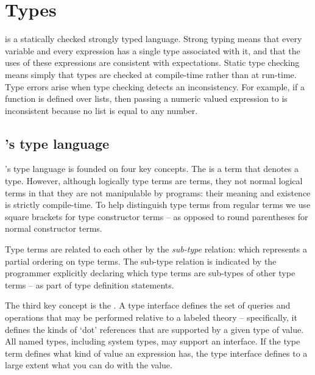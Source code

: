 \chapter{Types}
\label{types}

\go is a statically checked strongly typed language. 
Strong typing means that every variable and every expression has a single type associated with it, and that the uses of these expressions are consistent with expectations. Static type checking means simply that types are checked at compile-time rather than at run-time.  Type errors arise when type checking detects an inconsistency. For example, if a function  is defined over lists, then passing a numeric valued expression to  is inconsistent because no list is equal to any number. 

\section{\go's type language}
\go's type language is founded on four key concepts. The  is a term that denotes a type. However, although logically type terms are terms, they not normal logical terms in that they are not manipulable by \go programs: their meaning and existence is strictly compile-time. To help distinguish type terms from regular terms we use square brackets for type constructor terms -- as opposed to round parentheses for normal constructor terms.

Type terms are related to each other by the \emph{sub-type} relation: which represents a partial ordering on type terms. The sub-type relation is indicated by the programmer explicitly declaring which type terms are sub-types of other type terms -- as part of type definition statements.

The third key concept is the . A type interface defines the set of queries and operations that may be performed relative to a labeled theory -- specifically, it defines the kinds of `dot' references that are supported by a given type of value. All named types, including system types, may support an interface. If the type term defines what kind of value an expression has, the type interface defines to a large extent what you can do with the value.

